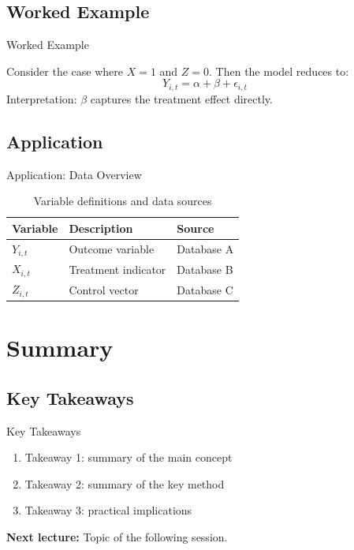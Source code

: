 \documentclass[aspectratio=169]{beamer}
\begin{document}
\subsection{Worked Example}

\begin{autoframe}{Worked Example}
    \begin{example}
        Consider the case where $X = 1$ and $Z = 0$.
        Then the model reduces to:
        \[
            Y_{i,t} = \alpha + \beta + \epsilon_{i,t}
        \]
        Interpretation: $\beta$ captures the treatment effect directly.
    \end{example}
\end{autoframe}

\subsection{Application}

\begin{autoframe}{Application: Data Overview}
    \begin{table}[htpb]
        \centering
        \footnotesize
        \begin{tabular}{lll}
            \toprule
            \textbf{Variable} & \textbf{Description} & \textbf{Source} \\
            \midrule
            $Y_{i,t}$  & Outcome variable    & Database A \\
            $X_{i,t}$  & Treatment indicator & Database B \\
            $Z_{i,t}$  & Control vector      & Database C \\
            \bottomrule
        \end{tabular}
        \caption{Variable definitions and data sources}
    \end{table}
\end{autoframe}


\section{Summary}

\subsection{Key Takeaways}

\begin{autoframe}{Key Takeaways}
    \begin{enumerate}
        \item Takeaway 1: summary of the main concept
        \item Takeaway 2: summary of the key method
        \item Takeaway 3: practical implications
    \end{enumerate}

    \vspace{1em}
    \textbf{Next lecture:} Topic of the following session.
\end{autoframe}
\end{document}

